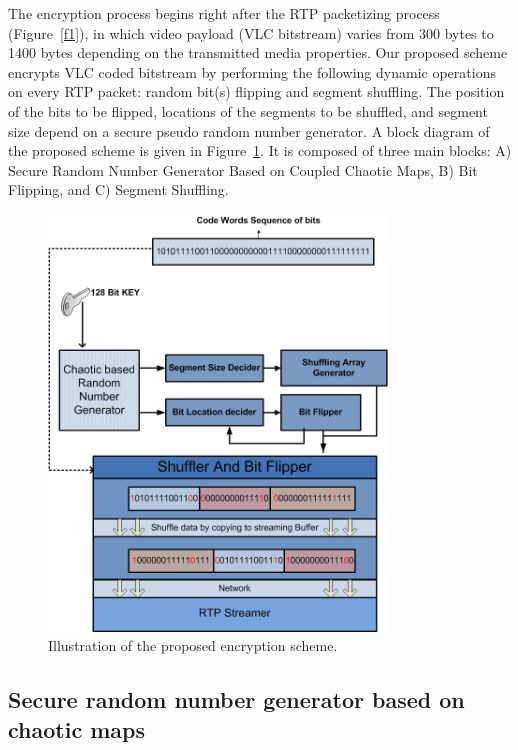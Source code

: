 \documentclass[preprint]{elsarticle}
\begin{document}
The encryption process begins right after the RTP packetizing process (Figure~\ref{f1}), in which video payload (VLC bitstream) varies from 300 bytes to 1400 bytes depending on the transmitted media properties. Our proposed scheme encrypts VLC coded bitstream by performing the following dynamic operations on every RTP packet: random bit(s) flipping and segment shuffling. The position of the bits to be flipped, locations of the segments to be shuffled, and segment size depend on a secure pseudo random number generator. A block diagram of the proposed scheme is given in Figure~\ref{f2}. It is composed of three main blocks: A) Secure Random Number Generator Based on Coupled Chaotic Maps, B) Bit Flipping, and C) Segment Shuffling.

\begin{figure}[!ht]
\centering
\includegraphics[width=9cm]{figure2.png}
\caption{Illustration of the proposed encryption scheme.}
\label{f2}
\end{figure}

\subsection{Secure random number generator based on chaotic maps}
\end{document}
